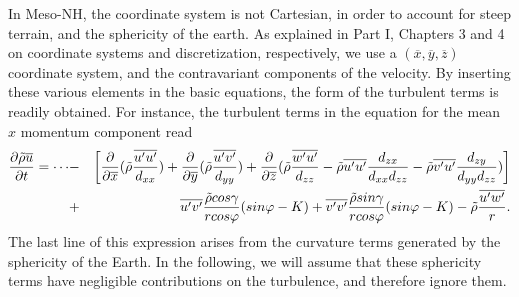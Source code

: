 In Meso-NH, the coordinate system is not Cartesian, in order to account
for steep terrain, and the sphericity of the earth. As explained in Part I,
Chapters 3 and 4 on coordinate systems and discretization, respectively,
we use a $(\overline{x},\overline{y},\overline{z})$ coordinate
system, and the contravariant components of the velocity. By inserting these
various elements in the basic equations, the form of the turbulent terms
is readily obtained. For instance, the turbulent terms in the equation
for the mean $x$ momentum component read
\begin{eqnarray}
{\partial \tilde{\rho} \overline{u}\over \partial t}=\cdots
&-&\left[\frac{\partial}{\partial \overline{x}}(\tilde{\rho}
\frac{\overline{u'u'}}{d_{xx}})+\frac{\partial}{\partial \overline{y}}
(\tilde{\rho}\frac{\overline{u'v'}}{d_{yy}})+
\frac{\partial}{\partial \overline{z}}(\tilde{\rho}\frac{\overline{w'u'}}
{d_{zz}}-\tilde{\rho}\overline{u'u'}\frac{d_{zx}}{d_{xx}d_{zz}}
-\tilde{\rho}\overline{v'u'}\frac{d_{zy}}{d_{yy}d_{zz}}) \right ]\nonumber\\
&+&\overline{u'v'}\frac{\tilde{\rho}cos\gamma}{rcos\varphi}(sin \varphi -K)
+\overline{v'v'}\frac{\tilde{\rho}sin\gamma}{rcos\varphi}(sin \varphi -K)
-\tilde{\rho}\frac{\overline{u'w'}}{r}.
\end{eqnarray}
The last line of this expression  arises from the curvature terms
generated by the sphericity of the Earth.
In the following, we will assume that these sphericity terms have negligible
contributions on the turbulence, and therefore ignore them.

